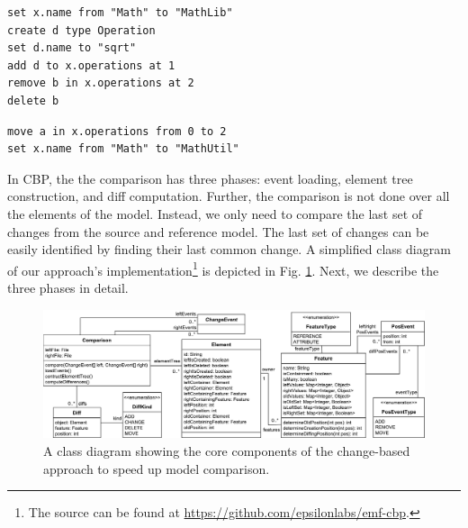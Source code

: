 \documentclass{jot}
\begin{document}
\begin{minipage}[t]{0.49\linewidth}    
\begin{lstlisting}[firstnumber=13,style=eol,caption={The appended changes made by Bob to produce the model in Fig. \ref{fig:left}  (left version).},label=lst:leftcbp]
set x.name from "Math" to "MathLib"
create d type Operation
set d.name to "sqrt"
add d to x.operations at 1
remove b in x.operations at 2
delete b
\end{lstlisting}
\end{minipage}
\hfill
\begin{minipage}[t]{0.49\linewidth}
\begin{lstlisting}[firstnumber=13,style=eol,caption={The appended changes made by Alice to produce the model in Fig. \ref{fig:right} (right version).},label=lst:rightcbp]
move a in x.operations from 0 to 2
set x.name from "Math" to "MathUtil"
\end{lstlisting}
\end{minipage}

In CBP, the the comparison has three phases: event loading, element tree construction, and diff computation.
Further, the comparison is not done over all the elements of the model.
Instead, we only need to compare the last set of changes from the source and reference model.
The last set of changes can be easily identified by finding their last common change.
A simplified class diagram of our approach's implementation\footnote{The source can be found at \url{https://github.com/epsilonlabs/emf-cbp}.} is depicted in Fig. \ref{fig:approach_class_diagram}. 
Next, we describe the three phases in detail.

\begin{figure}
    \includegraphics[width=\linewidth]{TreeClassDiagram}
    \caption{A class diagram showing the core components of the change-based approach to speed up model comparison.}
    \label{fig:approach_class_diagram}
\end{figure}
\end{document}
